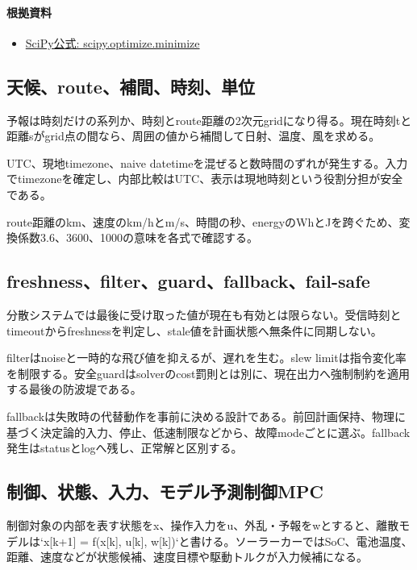 \documentclass[a4paper,11pt]{article}
\begin{document}
\paragraph{根拠資料}
\begin{itemize}[leftmargin=1.6em]
\item \href{https://docs.scipy.org/doc/scipy/reference/generated/scipy.optimize.minimize.html}{SciPy公式: scipy.optimize.minimize}
\end{itemize}

\subsection{天候、route、補間、時刻、単位}
予報は時刻だけの系列か、時刻とroute距離の2次元gridになり得る。現在時刻tと距離sがgrid点の間なら、周囲の値から補間して日射、温度、風を求める。


UTC、現地timezone、naive datetimeを混ぜると数時間のずれが発生する。入力でtimezoneを確定し、内部比較はUTC、表示は現地時刻という役割分担が安全である。


route距離のkm、速度のkm/hとm/s、時間の秒、energyのWhとJを跨ぐため、変換係数3.6、3600、1000の意味を各式で確認する。



\subsection{freshness、filter、guard、fallback、fail-safe}
分散システムでは最後に受け取った値が現在も有効とは限らない。受信時刻とtimeoutからfreshnessを判定し、stale値を計画状態へ無条件に同期しない。


filterはnoiseと一時的な飛び値を抑えるが、遅れを生む。slew limitは指令変化率を制限する。安全guardはsolverのcost罰則とは別に、現在出力へ強制制約を適用する最後の防波堤である。


fallbackは失敗時の代替動作を事前に決める設計である。前回計画保持、物理に基づく決定論的入力、停止、低速制限などから、故障modeごとに選ぶ。fallback発生はstatusとlogへ残し、正常解と区別する。



\subsection{制御、状態、入力、モデル予測制御MPC}
制御対象の内部を表す状態をx、操作入力をu、外乱・予報をwとすると、離散モデルは`x[k+1] = f(x[k], u[k], w[k])`と書ける。ソーラーカーではSoC、電池温度、距離、速度などが状態候補、速度目標や駆動トルクが入力候補になる。
\end{document}
